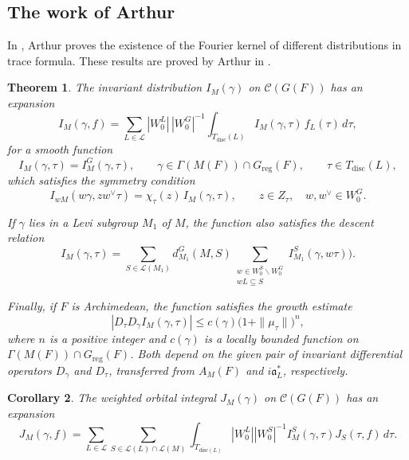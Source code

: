 \documentclass[11pt]{amsart}
\newtheorem {theorem}    {Theorem}[section]
\newtheorem {corollary}  [theorem]    {Corollary}
\renewcommand{\rm}{\mathrm}
\theoremstyle{definition}
\numberwithin{equation}{section}
\begin{document}
	\subsection{The work of Arthur}
	In \cite{Art94}, Arthur proves the existence of the Fourier kernel of different distributions in trace formula. These results are proved by Arthur in \cite{Art94}.
	\begin{theorem}\label{A1}
The invariant distribution \(I_M(\gamma)\) on
\(\mathcal{C}(G(F))\) has an expansion
\begin{equation}
I_M(\gamma,f)
=
\sum_{L\in\mathcal{L}}
|W_0^L|\,|W_0^G|^{-1}
\int_{T_{\mathrm{disc}}(L)}
I_M(\gamma,\tau)\,f_L(\tau)\,d\tau,
\end{equation}
for a smooth function
\[
I_M(\gamma,\tau)=I_M^G(\gamma,\tau),
\qquad
\gamma\in\Gamma(M(F))\cap G_{\mathrm{reg}}(F),
\qquad
\tau\in T_{\mathrm{disc}}(L),
\]
which satisfies the symmetry condition
\begin{equation}\label{eq:fourier-kernel-symmetry}
I_{wM}(w\gamma,z w^\vee\tau)
=
\chi_\tau(z)\,I_M(\gamma,\tau),
\qquad
z\in Z_\tau,
\quad
w,w^\vee\in W_0^G.
\end{equation}

If \(\gamma\) lies in a Levi subgroup \(M_1\) of \(M\),
the function also satisfies the descent relation
\begin{equation}\label{eq:fourier-kernel-descent}
I_M(\gamma,\tau)
=
\sum_{S\in\mathcal{L}(M_1)}
d_{M_1}^G(M,S)
\sum_{\substack{
w\in W_0^S\backslash W_0^G\\
wL\subseteq S
}}
I_{M_1}^S(\gamma,w\tau)).
\end{equation}

Finally, if \(F\) is Archimedean, the function satisfies
the growth estimate
\begin{equation}\label{eq:fourier-kernel-growth}
\left|
D_\tau D_\gamma I_M(\gamma,\tau)
\right|
\leq
c(\gamma)\bigl(1+\|\mu_\tau\|\bigr)^n,
\end{equation}
where \(n\) is a positive integer and \(c(\gamma)\) is a
locally bounded function on
\(\Gamma(M(F))\cap G_{\mathrm{reg}}(F)\).
Both depend on the given pair of invariant differential
operators \(D_\gamma\) and \(D_\tau\), transferred from
\(A_M(F)\) and \(i\mathfrak{a}_L^*\), respectively.
\end{theorem}
	
	\begin{corollary}\label{32}
		The weighted orbital integral \( J_M(\gamma) \) on \( \mathscr{C}(G(F)) \) has an expansion
		\[
		J_M(\gamma, f) = \sum_{L \in \mathcal{L}} \sum_{S \in \mathcal{L}(L) \cap \mathcal{L}(M)} \int_{T_{\rm{disc}(L)}} |W_0^L| |W_0^S|^{-1} I_M^S(\gamma, \tau) J_S(\tau, f) \, d\tau.
		\]
	\end{corollary}
	
\end{document}
